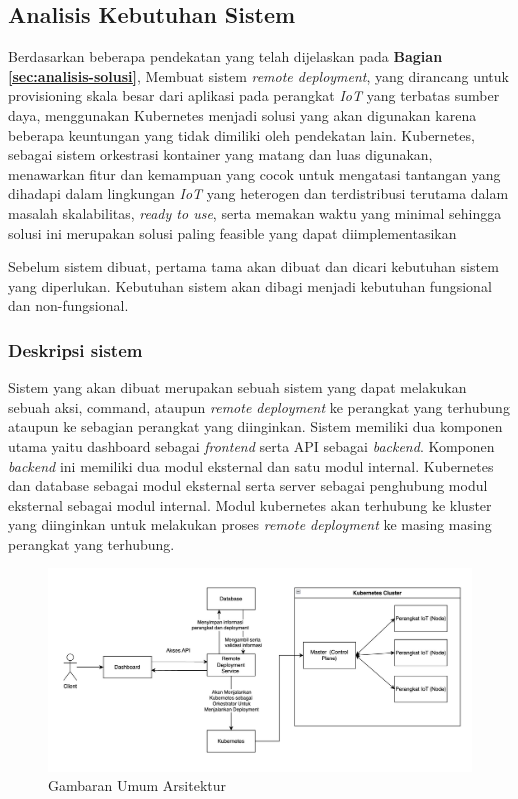 \subsection{Analisis Kebutuhan Sistem}
\label{sec:analisis-kebutuhan-sistem}

Berdasarkan beberapa pendekatan yang telah dijelaskan pada \textbf{Bagian \ref{sec:analisis-solusi}}, Membuat sistem \textit{remote deployment}, yang dirancang untuk provisioning skala besar dari aplikasi pada perangkat \textit{IoT} yang terbatas sumber daya, menggunakan Kubernetes menjadi solusi yang akan digunakan karena beberapa keuntungan yang tidak dimiliki oleh pendekatan lain. Kubernetes, sebagai sistem orkestrasi kontainer yang matang dan luas digunakan, menawarkan fitur dan kemampuan yang cocok untuk mengatasi tantangan yang dihadapi dalam lingkungan \textit{IoT} yang heterogen dan terdistribusi terutama dalam masalah skalabilitas, \textit{ready to use}, serta memakan waktu yang minimal sehingga solusi ini merupakan solusi paling feasible yang dapat diimplementasikan


Sebelum sistem dibuat, pertama tama akan dibuat dan dicari kebutuhan sistem yang diperlukan. Kebutuhan sistem akan dibagi menjadi kebutuhan fungsional dan non-fungsional.

\subsubsection{Deskripsi sistem}
Sistem yang akan dibuat merupakan sebuah sistem yang dapat melakukan sebuah aksi, command, ataupun \textit{remote deployment} ke perangkat yang terhubung ataupun ke sebagian perangkat yang diinginkan. Sistem memiliki dua komponen utama yaitu dashboard sebagai \textit{frontend} serta API sebagai \textit{backend}. Komponen \textit{backend} ini memiliki dua modul eksternal dan satu modul internal. Kubernetes dan database sebagai modul eksternal serta server sebagai penghubung modul eksternal sebagai modul internal. Modul kubernetes akan terhubung ke kluster yang diinginkan untuk melakukan proses \textit{remote deployment} ke masing masing perangkat yang terhubung.

\begin{figure}[ht]
  \centering
  \includegraphics[width=1\textwidth]{resources/chapter-3/gambaran-umum-arsitektur-updated.jpg}
  \caption{Gambaran Umum Arsitektur}
  \label{fig:gambaran-umum-arsitektur}
\end{figure}

\pagebreak






